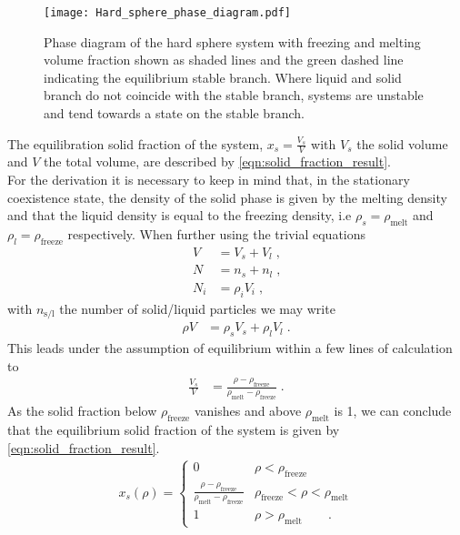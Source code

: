 \begin{figure}[h]
\centering
\texttt{[image: Hard\_sphere\_phase\_diagram.pdf]}
\caption[Phase diagram of hard sphere fluid]{Phase diagram of the hard sphere system with freezing and melting volume fraction shown as shaded lines and the green dashed line indicating the equilibrium stable branch. Where liquid and solid branch do not coincide with the stable branch, systems are unstable and tend towards a state on the stable branch.}
\label{fig:hs_phase_diagram}
\end{figure}
\FloatBarrier
The equilibration solid fraction of the system, $x_s = \frac{V_s}{V}$ with $V_s$ the solid volume and $V$ the total volume, are described by \autoref{eqn:solid_fraction_result}.\\ 
For the derivation it is necessary to keep in mind that, in the stationary coexistence state, the density of the solid phase is given by the melting density and that the liquid density is equal to the freezing density, i.e $\rho_s = \rho_{\text{melt}}$ and $\rho_l = \rho_{\text{freeze}}$ respectively. When further using the trivial equations
\begin{align}
V &= V_s + V_l \; \text{,} \nonumber\\
N &= n_s + n_l \; \text{,} \nonumber\\
N_i &= \rho_i V_i \; \text{,} 
\end{align}
with $n_{\text{s/l}}$ the number of solid/liquid particles we may write
\begin{align}
\rho V &= \rho_s V_s + \rho_l V_l \; \text{.}
\end{align}
This leads under the assumption of equilibrium within a few lines of calculation to 
\begin{align}
\frac{V_s}{V} &= \frac{\rho - \rho_{\text{freeze}}}{\rho_{\text{melt}} - \rho_{\text{freeze}} } \; \text{.}
\end{align}
As the solid fraction below $\rho_{\text{freeze}} $ vanishes and above $\rho_{\text{melt}}$ is 1, we can conclude that the equilibrium solid fraction of the system is given by \autoref{eqn:solid_fraction_result}.
\begin{align}
\label{eqn:solid_fraction_result}
x_s(\rho) = 
\begin{cases}
0 & \rho <  \rho_{\text{freeze}}\\
\frac{\rho-\rho_{\text{freeze}}}{\rho_{\text{melt}}-\rho_{\text{freeze}}} &  \rho_{\text{freeze}} < \rho <  \rho_{\text{melt}}\\ 
1 &  \rho > \rho_{\text{melt}} \quad \quad \text{.}
\end{cases}
\end{align}

